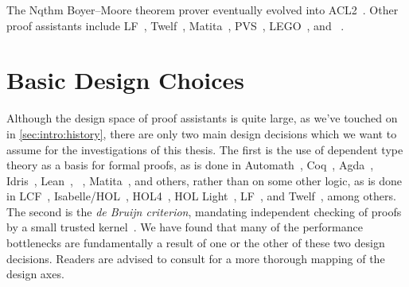 The Nqthm Boyer--Moore theorem prover eventually evolved into ACL2~\cite{ACL2,ACL2Applications}.
Other proof assistants include LF~\cite{pfenning1991logic,harper93,Logical2002Pfenning}, Twelf~\cite{pfenning1999system}, Matita~\cite{asperti2007user,Matita2011Asperti}, PVS~\cite{owre1996pvs,PVS1992Owre}, LEGO~\cite{LEGO1994Pollack}, and \NuPRL~\cite{nuprl}.


\section{Basic Design Choices}\label{sec:intro:proof-assistant-design-choices}
Although the design space of proof assistants is quite large, as we've touched on in \autoref{sec:intro:history}, there are only two main design decisions which we want to assume for the investigations of this thesis.
The first is the use of dependent type theory as a basis for formal proofs, as is done in Automath~\cite{wiki:AutoMath,mathematical1970Bruijn,Survey1994deBruijn}, Coq~\cite{Coq}, Agda~\cite{Dependently2009Norell}, Idris~\cite{Idris2013Brady}, Lean~\cite{Lean2015Moura}, \NuPRL~\cite{nuprl}, Matita~\cite{Matita2011Asperti}, and others, rather than on some other logic, as is done in LCF~\cite{LCF2000Gordon,gordon1979edinburgh,gordon1978metalanguage}, Isabelle/HOL~\cite{LCF2019Paulson,Isabelle/Isar2002Wenzel,Isabelle,paulson1994isabelle}, HOL4~\cite{slind2008brief}, HOL Light~\cite{harrison1996hol}, LF~\cite{pfenning1991logic,harper93}, and Twelf~\cite{pfenning1999system}, among others.
The second is the \emph{de Bruijn criterion}, mandating independent checking of proofs by a small trusted kernel~\cite{challenge2005Barendregt}.
We have found that many of the performance bottlenecks are fundamentally a result of one or the other of these two design decisions.
Readers are advised to consult \textcite[ch.~4]{ringer2020qed} for a more thorough mapping of the design axes.

